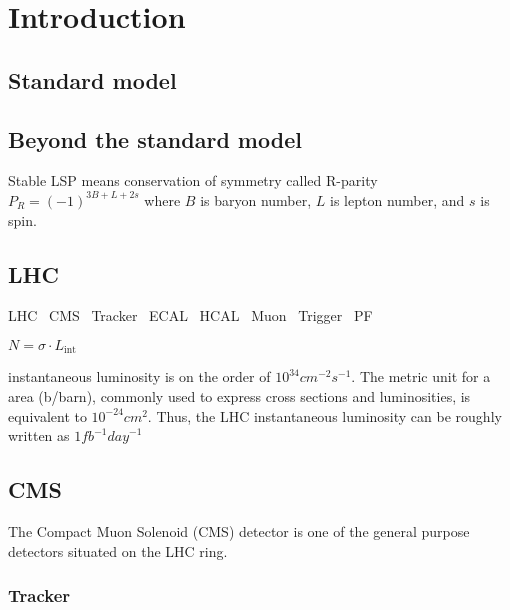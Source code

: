 \chapter{Introduction}


\section{Standard model}


\section{Beyond the standard model}


Stable LSP means conservation of symmetry called R-parity
$P_R=(-1)^{3B+L+2s}$ where $B$ is baryon number, $L$ is lepton number,
and $s$ is spin.

\section{LHC}


LHC~\cite{LHC:Evans1129806}
CMS~\cite{CMS:Chatrchyan2008zzk,CMS:PTDR2}
Tracker~\cite{CMS:TRK11001,CMS:Dominguez1481838}
ECAL~\cite{CMS:Khachatryan2015hwa}
HCAL~\cite{CMS:PTDR2}
Muon~\cite{CMS:Sirunyan2018fpa}
Trigger~\cite{CMS:Khachatryan2016bia}
PF~\cite{CMS:PRF14001}

$N = \sigma \cdot L_\text{int}$

instantaneous luminosity is on the order of $10^{34} \unit{cm}^{-2} \unit{s}^{-1}$.
The metric unit for a area (b/barn), commonly used to express cross sections and luminosities,
is equivalent to $10^{-24} \unit{cm}^2$. Thus, the LHC instantaneous luminosity can
be roughly written as $1 \unit{fb}^{-1} \unit{day}^{-1}$


\section{CMS}

The Compact Muon Solenoid (CMS) detector is one of the general purpose detectors
situated on the LHC ring.

\subsection{Tracker}

